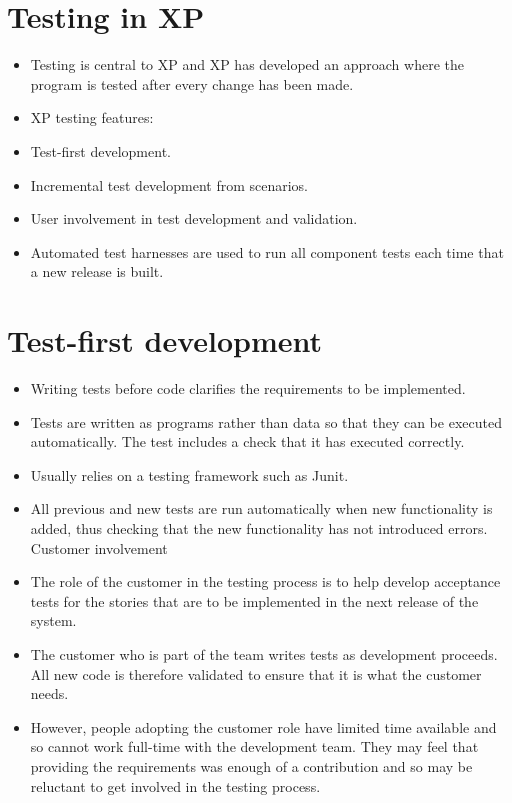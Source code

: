 \section{ Testing in XP}
\begin{itemize}

\item Testing is central to XP and XP has developed an approach where the program is tested after every change has been made.

\item XP testing features: \item Test-first development.
\item Incremental test development from scenarios. \item User involvement in test development and validation.
\item Automated test harnesses are used to run all component tests each time that a new release is built.

\end{itemize}
\section{ Test-first development}
\begin{itemize}

\item Writing tests before code clarifies the requirements to be implemented.

\item Tests are written as programs rather than data so that they can be executed automatically. The test includes a check that it has executed correctly.

\item Usually relies on a testing framework such as Junit.

\item All previous and new tests are run automatically when new functionality is added, thus checking that the new functionality has not introduced errors.
Customer involvement
\item The role of the customer in the testing process is to help develop acceptance tests for the stories that are to be implemented in the next release of the system.

\item The customer who is part of the team writes tests as development proceeds. All new code is therefore validated to ensure that it is what the customer needs.

\item However, people adopting the customer role have limited time available and so cannot work full-time with the development team. They may feel that providing the requirements was enough of a contribution and so may be reluctant to get involved in the testing process.


\end{itemize}
\newpage
